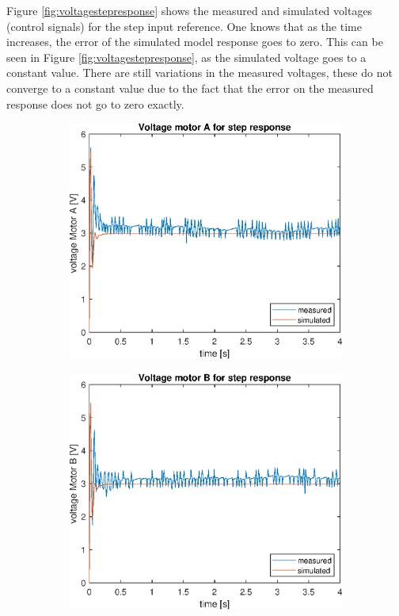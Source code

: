 \documentclass[a4paper,kul]{kulakarticle} %
\begin{document}
\noindent Figure \ref{fig:voltagestepresponse} shows the measured and simulated voltages (control signals) for the step input reference. One knows that as the time increases, the error of the simulated model response goes to zero. This can be seen in Figure \ref{fig:voltagestepresponse}, as the simulated voltage goes to a constant value. There are still variations in the measured voltages, these do not converge to a constant value due to the fact that the error on the measured response does not go to zero exactly.
\begin{figure}[htp!]
	\centering
	\begin{subfigure}[b]{0.49\textwidth}
		\centering
		\includegraphics[width=\linewidth]{comparison_voltage_stepresponseA.eps}
		
	\end{subfigure}
	\hfill
	\begin{subfigure}[b]{0.49\textwidth}  
		\centering
		\includegraphics[width=\linewidth]{comparison_voltage_stepresponseB.eps}
		

\end{subfigure}
\end{figure}
\end{document}
